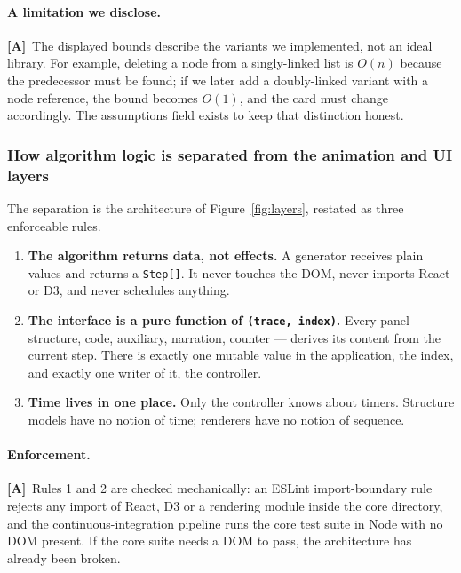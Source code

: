 \documentclass[11pt,a4paper]{article}
\newcommand{\A}{\textcolor{asmc}{\textbf{[A]}}}     %
\newcommand{\ct}[1]{\texttt{#1}}
\begin{document}
\paragraph{A limitation we disclose.} \A\ The displayed bounds describe the variants we
implemented, not an ideal library. For example, deleting a node from a singly-linked list
is $O(n)$ because the predecessor must be found; if we later add a doubly-linked variant
with a node reference, the bound becomes $O(1)$, and the card must change accordingly. The
assumptions field exists to keep that distinction honest.

\subsubsection{How algorithm logic is separated from the animation and UI layers}

The separation is the architecture of Figure~\ref{fig:layers}, restated as three enforceable
rules.

\begin{enumerate}[leftmargin=1.6em,itemsep=2pt]
  \item \textbf{The algorithm returns data, not effects.} A generator receives plain values
        and returns a \ct{Step[]}. It never touches the DOM, never imports React or D3, and
        never schedules anything.
  \item \textbf{The interface is a pure function of \ct{(trace, index)}.} Every panel ---
        structure, code, auxiliary, narration, counter --- derives its content from the
        current step. There is exactly one mutable value in the application, the index, and
        exactly one writer of it, the controller.
  \item \textbf{Time lives in one place.} Only the controller knows about timers. Structure
        models have no notion of time; renderers have no notion of sequence.
\end{enumerate}

\paragraph{Enforcement.} \A\ Rules 1 and 2 are checked mechanically: an ESLint
import-boundary rule rejects any import of React, D3 or a rendering module inside the core
directory, and the continuous-integration pipeline runs the core test suite in Node with no
DOM present. If the core suite needs a DOM to pass, the architecture has already been
broken.
\end{document}
